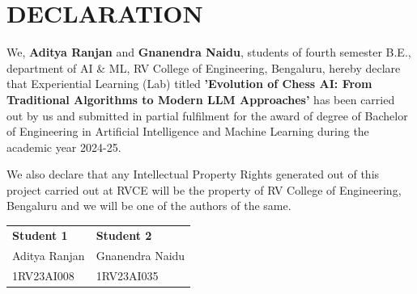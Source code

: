 \documentclass[11pt,a4paper]{report}
\begin{document}
\newpage

\chapter*{DECLARATION}
\thispagestyle{fancy}

\vspace{1cm}

We, \textbf{Aditya Ranjan} and \textbf{Gnanendra Naidu}, students of fourth semester B.E., department of AI \& ML, RV College of Engineering, Bengaluru, hereby declare that Experiential Learning (Lab) titled \textbf{'Evolution of Chess AI: From Traditional Algorithms to Modern LLM Approaches'} has been carried out by us and submitted in partial fulfilment for the award of degree of Bachelor of Engineering in Artificial Intelligence and Machine Learning during the academic year 2024-25.

\vspace{0.5cm}

We also declare that any Intellectual Property Rights generated out of this project carried out at RVCE will be the property of RV College of Engineering, Bengaluru and we will be one of the authors of the same.

\vspace{2cm}

\begin{center}
\begin{tabular}{p{6cm}p{6cm}}
\textbf{Student 1} & \textbf{Student 2} \\
Aditya Ranjan & Gnanendra Naidu \\
1RV23AI008 & 1RV23AI035 \\
\end{tabular}
\end{center}

\newpage
\end{document}
